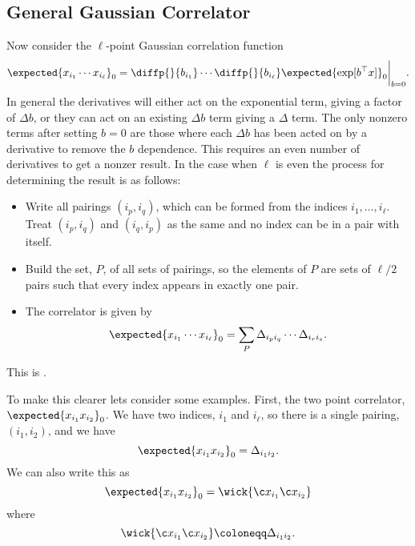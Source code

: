 \documentclass[fleqn]{NotesClass}
\newcommand{\trans}{{\top}}
\begin{document}
    \subsection{General Gaussian Correlator}
    Now consider the \(\ell\)-point Gaussian correlation function
    \begin{equation}
        \expected{x_{i_1} \dotsm x_{i_\ell}}_0 = \diffp{}{b_{i_1}} \dotsm \diffp{}{b_{i_\ell}} \expected{\exp[b^\trans x]}_0 \bigg|_{b = 0}.
    \end{equation}
    In general the derivatives will either act on the exponential term, giving a factor of \(\Delta b\), or they can act on an existing \(\Delta b\) term giving a \(\Delta\) term.
    The only nonzero terms after setting \(b = 0\) are those where each \(\Delta b\) has been acted on by a derivative to remove the \(b\) dependence.
    This requires an even number of derivatives to get a nonzer result.
    In the case when \(\ell\) is even the process for determining the result is as follows:
    \begin{itemize}
        \item Write all pairings \((i_p, i_q)\), which can be formed from the indices \(i_1, \dotsc, i_\ell\).
        Treat \((i_p, i_q)\) and \((i_q, i_p)\) as the same and no index can be in a pair with itself.
        \item Build the set, \(P\), of all sets of pairings, so the elements of \(P\) are sets of \(\ell/2\) pairs such that every index appears in exactly one pair.
        \item The correlator is given by
        \begin{equation}
            \expected{x_{i_1}\dotsm x_{i_\ell}}_0 = \sum_{P} \Delta_{i_p i_q} \dotsm \Delta_{i_ri_s}.
        \end{equation}
    \end{itemize}
    This is .
    
    To make this clearer lets consider some examples.
    First, the two point correlator, \(\expected{x_{i_1}x_{i_2}}_0\).
    We have two indices, \(i_1\) and \(i_\ell\), so there is a single pairing, \((i_1, i_2)\), and we have
    \begin{equation}
        \expected{x_{i_1}x_{i_2}}_0 = \Delta_{i_1i_2}.
    \end{equation}
    We can also write this as
    \begin{equation}
        \expected{x_{i_1}x_{i_2}}_0 = \wick{\c x_{i_1} \c x_{i_2}}
    \end{equation}
    where
    \begin{equation}
        \wick{\c x_{i_1} \c x_{i_2}} \coloneqq \Delta_{i_1i_2}.
    \end{equation}
    
\end{document}
